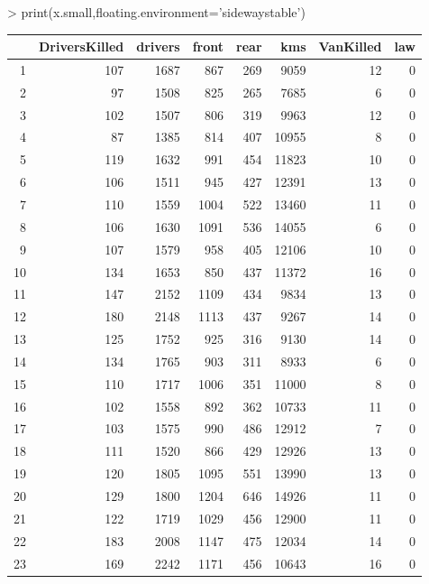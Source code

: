 \documentclass[letterpaper]{article}
\begin{document}
\begin{Schunk}
\begin{Sinput}
> print(x.small,floating.environment='sidewaystable')
\end{Sinput}
% latex table generated in R 3.1.1 by xtable 1.7-3 package
% 
\begin{sidewaystable}[ht]
\centering
\begin{tabular}{rrrrrrrr}
  \hline
 & DriversKilled & drivers & front & rear & kms & VanKilled & law \\ 
  \hline
1 & 107 & 1687 & 867 & 269 & 9059 & 12 & 0 \\ 
  2 & 97 & 1508 & 825 & 265 & 7685 & 6 & 0 \\ 
  3 & 102 & 1507 & 806 & 319 & 9963 & 12 & 0 \\ 
  4 & 87 & 1385 & 814 & 407 & 10955 & 8 & 0 \\ 
  5 & 119 & 1632 & 991 & 454 & 11823 & 10 & 0 \\ 
  6 & 106 & 1511 & 945 & 427 & 12391 & 13 & 0 \\ 
  7 & 110 & 1559 & 1004 & 522 & 13460 & 11 & 0 \\ 
  8 & 106 & 1630 & 1091 & 536 & 14055 & 6 & 0 \\ 
  9 & 107 & 1579 & 958 & 405 & 12106 & 10 & 0 \\ 
  10 & 134 & 1653 & 850 & 437 & 11372 & 16 & 0 \\ 
  11 & 147 & 2152 & 1109 & 434 & 9834 & 13 & 0 \\ 
  12 & 180 & 2148 & 1113 & 437 & 9267 & 14 & 0 \\ 
  13 & 125 & 1752 & 925 & 316 & 9130 & 14 & 0 \\ 
  14 & 134 & 1765 & 903 & 311 & 8933 & 6 & 0 \\ 
  15 & 110 & 1717 & 1006 & 351 & 11000 & 8 & 0 \\ 
  16 & 102 & 1558 & 892 & 362 & 10733 & 11 & 0 \\ 
  17 & 103 & 1575 & 990 & 486 & 12912 & 7 & 0 \\ 
  18 & 111 & 1520 & 866 & 429 & 12926 & 13 & 0 \\ 
  19 & 120 & 1805 & 1095 & 551 & 13990 & 13 & 0 \\ 
  20 & 129 & 1800 & 1204 & 646 & 14926 & 11 & 0 \\ 
  21 & 122 & 1719 & 1029 & 456 & 12900 & 11 & 0 \\ 
  22 & 183 & 2008 & 1147 & 475 & 12034 & 14 & 0 \\ 
  23 & 169 & 2242 & 1171 & 456 & 10643 & 16 & 0 \\ 

\end{tabular}
\end{sidewaystable}
\end{Schunk}
\end{document}
